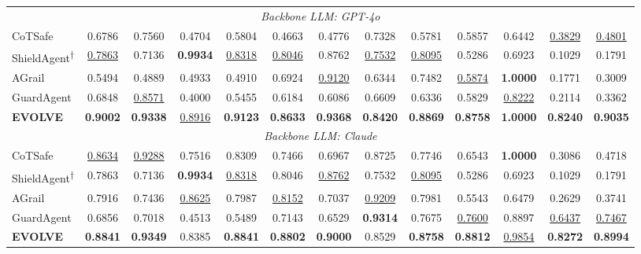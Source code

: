 \begin{table}[ht]
{\begin{tabular}{lcccccccccccc}
\multicolumn{13}{c}{\textit{Backbone LLM: GPT-4o}} \\[2pt]
CoTSafe
  & 0.6786 & 0.7560 & 0.4704 & 0.5804
  & 0.4663 & 0.4776 & 0.7328 & 0.5781
  & 0.5857 & 0.6442 & \underline{0.3829} & \underline{0.4801} \\
ShieldAgent\textsuperscript{$\dagger$}
  & \underline{0.7863} & 0.7136 & \textbf{0.9934} & \underline{0.8318}
  & \underline{0.8046} & 0.8762 & \underline{0.7532} & \underline{0.8095}
  & 0.5286 & 0.6923 & 0.1029 & 0.1791 \\
AGrail
  & 0.5494 & 0.4889 & 0.4933 & 0.4910
  & 0.6924 & \underline{0.9120} & 0.6344 & 0.7482
  & \underline{0.5874} & \textbf{1.0000} & 0.1771 & 0.3009 \\
GuardAgent
  & 0.6848 & \underline{0.8571} & 0.4000 & 0.5455
  & 0.6184 & 0.6086 & 0.6609 & 0.6336
  & 0.5829 & \underline{0.8222} & 0.2114 & 0.3362 \\
\textbf{EVOLVE}
  & \textbf{0.9002} & \textbf{0.9338} & \underline{0.8916} & \textbf{0.9123}
  & \textbf{0.8633} & \textbf{0.9368} & \textbf{0.8420} & \textbf{0.8869}
  & \textbf{0.8758} & \textbf{1.0000} & \textbf{0.8240} & \textbf{0.9035} \\

\midrule

\multicolumn{13}{c}{\textit{Backbone LLM: Claude}} \\[2pt]
CoTSafe
  & \underline{0.8634} & \underline{0.9288} & 0.7516 & 0.8309
  & 0.7466 & 0.6967 & 0.8725 & 0.7746
  & 0.6543 & \textbf{1.0000} & 0.3086 & 0.4718 \\
ShieldAgent\textsuperscript{$\dagger$}
  & 0.7863 & 0.7136 & \textbf{0.9934} & \underline{0.8318}
  & 0.8046 & \underline{0.8762} & 0.7532 & \underline{0.8095}
  & 0.5286 & 0.6923 & 0.1029 & 0.1791 \\
AGrail
  & 0.7916 & 0.7436 & \underline{0.8625} & 0.7987
  & \underline{0.8152} & 0.7037 & \underline{0.9209} & 0.7981
  & 0.5543 & 0.6479 & 0.2629 & 0.3741 \\
GuardAgent
  & 0.6856 & 0.7018 & 0.4513 & 0.5489
  & 0.7143 & 0.6529 & \textbf{0.9314} & 0.7675
  & \underline{0.7600} & 0.8897 & \underline{0.6437} & \underline{0.7467} \\
\textbf{EVOLVE}
  & \textbf{0.8841} & \textbf{0.9349} & 0.8385 & \textbf{0.8841}
  & \textbf{0.8802} & \textbf{0.9000} & 0.8529 & \textbf{0.8758}
  & \textbf{0.8812} & \underline{0.9854} & \textbf{0.8272} & \textbf{0.8994} \\


\end{tabular}}
\end{table}
